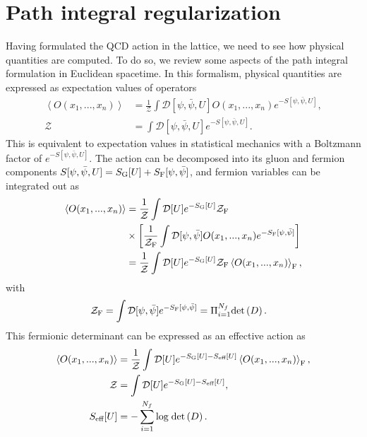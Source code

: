 \section{Path integral regularization}
\label{ch_foundation:sec:path}

Having formulated the QCD action in the lattice, we need to see how physical quantities are computed. To do so, we review some aspects of the path integral formulation in Euclidean spacetime. In this formalism, physical quantities are expressed as expectation values of operators
\begin{align}
\left<{O}(x_1,...,x_n)\right>&=\frac{1}{\mathcal{Z}}\int\mathcal{D}[\psi,\bar{\psi},U]{O}(x_1,...,x_n)e^{-S[\psi,\bar{\psi},U]}, \\
\mathcal{Z}&=\int\mathcal{D}[\psi,\bar{\psi},U]e^{-S[\psi,\bar{\psi},U]}.
\end{align}
This is equivalent to expectation values in statistical mechanics with a Boltzmann factor of $e^{-S[\psi,\bar{\psi},U]}$. The action can be decomposed into its gluon and fermion components $S[\psi,\bar{\psi},U]=S_{\textrm G}[U]+S_{\textrm F}[\psi,\bar{\psi}]$, and fermion variables can be integrated out as
\begin{align}
\left<{O}(x_1,...,x_n)\right>&=\frac{1}{\mathcal{Z}}\int\mathcal{D}[U]e^{-S_{\textrm G}[U]}\mathcal{Z}_{\textrm F}\notag \\
&\times\left[\frac{1}{\mathcal{Z}_{\textrm F}}\int\mathcal{D}[\psi,\bar{\psi}]{O}(x_1,...,x_n)e^{-S_{\textrm F}[\psi,\bar{\psi}]}\right] \\
&=\frac{1}{\mathcal{Z}}\int\mathcal{D}[U]e^{-S_{\textrm G}[U]}\mathcal{Z}_{\textrm F}\left<{O}(x_1,...,x_n)\right>_{\textrm F},
\end{align}
with 
\begin{align}
\mathcal{Z}_{\textrm F}&=\int\mathcal{D}[\psi,\bar{\psi}]e^{-S_{\textrm F}[\psi,\bar{\psi}]}=\Pi_{i=1}^{N_f}{\textrm{det}}\left(D\right).
\end{align}
This fermionic determinant can be expressed as an effective action as
\begin{align}
\left<{O}(x_1,...,x_n)\right>&=\frac{1}{\mathcal{Z}}\int\mathcal{D}[U]e^{-S_{\textrm G}[U]-S_{\textrm{eff}}[U]}\left<{O}(x_1,...,x_n)\right>_{\textrm F}, \\
\mathcal{Z}&=\int\mathcal{D}[U]e^{-S_{\textrm G}[U]-S_{\textrm{eff}}[U]}, \\
S_{\textrm{eff}}[U]&=-\sum_{i=1}^{N_f}{\textrm{log}}\;{\textrm{det}}\left(D\right).
\end{align}


